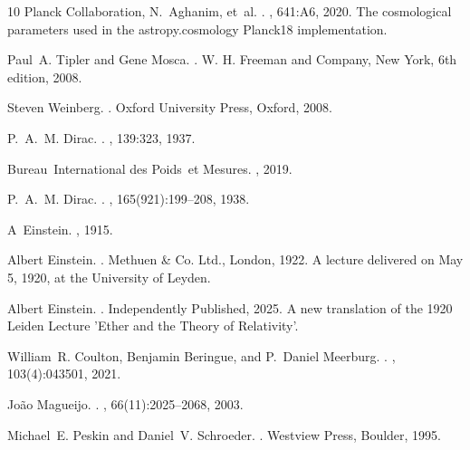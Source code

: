 \documentclass[12pt,leqno]{article}
\begin{document}
{\begin{thebibliography}{10}
		Planck Collaboration, N.~Aghanim, et~al.
		.
		, 641:A6, 2020.
		\newblock The cosmological parameters used in the astropy.cosmology Planck18
		implementation.
		
		Paul~A. Tipler and Gene Mosca.
		.
		\newblock W. H. Freeman and Company, New York, 6th edition, 2008.
		
		Steven Weinberg.
		.
		\newblock Oxford University Press, Oxford, 2008.
		
		P.~A.~M. Dirac.
		.
		, 139:323, 1937.
		
		Bureau~International des Poids~et Mesures.
		, 2019.
		
		P.~A.~M. Dirac.
		.
		, 165(921):199--208, 1938.
		
		A~Einstein.
		, 1915.
		
		Albert Einstein.
		.
		\newblock Methuen \& Co. Ltd., London, 1922.
		\newblock A lecture delivered on May 5, 1920, at the University of Leyden.
		
		Albert Einstein.
		.
		\newblock Independently Published, 2025.
		\newblock A new translation of the 1920 Leiden Lecture 'Ether and the Theory of
		Relativity'.
		
		William~R. Coulton, Benjamin Beringue, and P.~Daniel Meerburg.
		.
		, 103(4):043501, 2021.
		
		João Magueijo.
		.
		, 66(11):2025--2068, 2003.
		
		Michael~E. Peskin and Daniel~V. Schroeder.
		.
		\newblock Westview Press, Boulder, 1995.
		

\end{thebibliography}}
\end{document}
